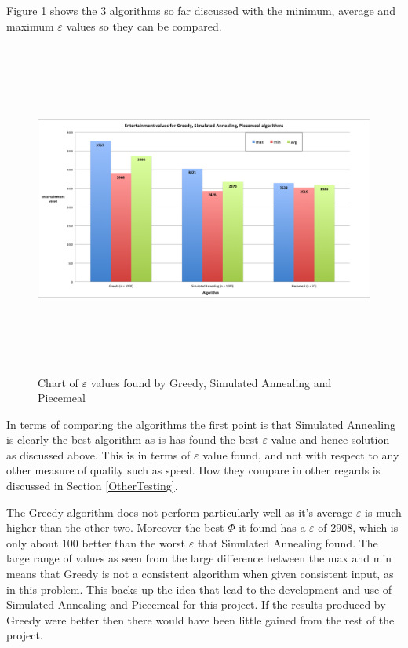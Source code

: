\documentclass[12pt]{report}
\begin{document}
Figure \ref{eScreenshot} shows the 3 algorithms so far discussed with the minimum, average and maximum $\varepsilon$ values so they can be compared.

\begin{figure}[H]
\centering
\includegraphics[width=18cm, height=11cm]{./entertainmentValues}
\caption{Chart of $\varepsilon$ values found by Greedy, Simulated Annealing and Piecemeal}
\label{eScreenshot}
\end{figure}

In terms of comparing the algorithms the first point is that Simulated Annealing is clearly the best algorithm as is has found the best $\varepsilon$ value and hence solution as discussed above. This is in terms of $\varepsilon$ value found, and not with respect to any other measure of quality such as speed. How they compare in other regards is discussed in Section \ref{OtherTesting}.

The Greedy algorithm does not perform particularly well as it's average $\varepsilon$ is much higher than the other two. Moreover the best $\Phi$ it found has a $\varepsilon$ of 2908, which is only about 100 better than the worst $\varepsilon$ that Simulated Annealing found. The large range of values as seen from the large difference between the max and min means that Greedy is not a consistent algorithm when given consistent input, as in this problem. This backs up the idea that lead to the development and use of Simulated Annealing and Piecemeal for this project. If the results produced by Greedy were better then there would have been little gained from the rest of the project. 
\end{document}
